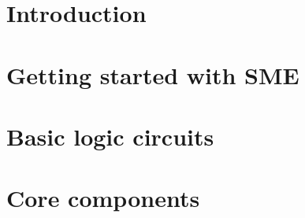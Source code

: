 \documentclass[a4paper]{article}
\begin{document}
\maketitle



\newpage
\tableofcontents
\newpage

\section{Introduction}


\newpage
\section{Getting started with SME}


\newpage
\section{Basic logic circuits}


\newpage
\section{Core components}

\end{document}
